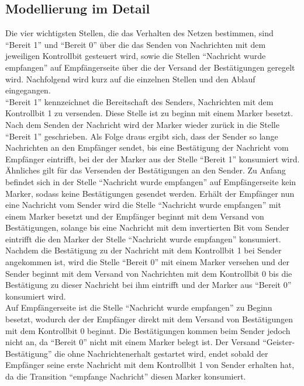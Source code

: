 \documentclass[10pt]{scrartcl}
\begin{document}
\subsection{Modellierung im Detail}
Die vier wichtigsten Stellen, die das Verhalten des Netzen bestimmen, sind "`Bereit 1"' und "`Bereit 0"' über die das Senden von Nachrichten mit dem jeweiligen Kontrollbit gesteuert wird, sowie die Stellen "`Nachricht wurde empfangen"' auf Empfängerseite über die der Versand der Bestätigungen geregelt wird. Nachfolgend wird kurz auf die einzelnen Stellen und den Ablauf eingegangen.\\
"`Bereit 1"' kennzeichnet die Bereitschaft des Senders, Nachrichten mit dem Kontrollbit 1 zu versenden. Diese Stelle ist zu beginn mit einem Marker besetzt. Nach dem Senden der Nachricht wird der Marker wieder zurück in die Stelle "`Bereit 1"' geschrieben. Als Folge draus ergibt sich, dass der Sender so lange Nachrichten an den Empfänger sendet, bis eine Bestätigung der Nachricht vom Empfänger eintrifft, bei der der Marker aus der Stelle "`Bereit 1"' konsumiert wird.\\
Ähnliches gilt für das Versenden der Bestätigungen an den Sender. Zu Anfang befindet sich in der Stelle "`Nachricht wurde empfangen"' auf Empfängerseite kein Marker, sodass keine Bestätigungen gesendet werden. Erhält der Empfänger nun eine Nachricht vom Sender wird die Stelle "`Nachricht wurde empfangen"' mit einem Marker besetzt und der Empfänger beginnt mit dem Versand von Bestätigungen, solange bis eine Nachricht mit dem invertierten Bit vom Sender eintrifft die den Marker der Stelle "`Nachricht wurde empfangen"' konsumiert.\\
Nachdem die Bestätigung zu der Nachricht mit dem Kontrollbit 1 bei Sender angekommen ist, wird die Stelle "`Bereit 0"' mit einem Marker versehen und der Sender beginnt mit dem Versand von Nachrichten mit dem Kontrollbit 0 bis die Bestätigung zu dieser Nachricht bei ihm eintrifft und der Marker aus "`Bereit 0"' konsumiert wird.\\
Auf Empfängerseite ist die Stelle "`Nachricht wurde empfangen"' zu Beginn besetzt, wodurch der der Empfänger direkt mit dem Versand von Bestätigungen mit dem Kontrollbit 0 beginnt. Die Bestätigungen kommen beim Sender jedoch nicht an, da "`Bereit 0"' nicht mit einem Marker belegt ist. Der Versand "`Geister-Bestätigung"' die ohne Nachrichtenerhalt gestartet wird, endet sobald der Empfänger seine erste Nachricht mit dem Kontrollbit 1 von Sender erhalten hat, da die Transition "`empfange Nachricht"' diesen Marker konsumiert.
\end{document}
